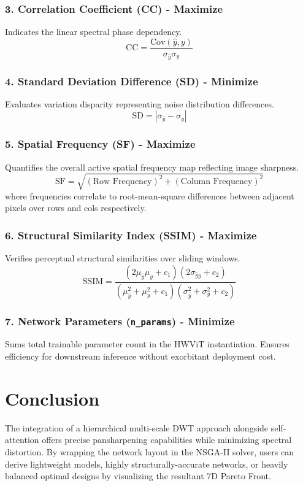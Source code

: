 \documentclass[11pt]{article}
\begin{document}
\subsubsection{3. Correlation Coefficient (CC) - Maximize}
Indicates the linear spectral phase dependency.
\[ \text{CC} = \frac{\text{Cov}(\hat{y}, y)}{\sigma_{\hat{y}} \sigma_y} \]

\subsubsection{4. Standard Deviation Difference (SD) - Minimize}
Evaluates variation disparity representing noise distribution differences.
\[ \text{SD} = \left| \sigma_{\hat{y}} - \sigma_y \right| \]

\subsubsection{5. Spatial Frequency (SF) - Maximize}
Quantifies the overall active spatial frequency map reflecting image sharpness.
\[ \text{SF} = \sqrt{ (\text{Row Frequency})^2 + (\text{Column Frequency})^2 } \]
where frequencies correlate to root-mean-square differences between adjacent pixels over rows and cols respectively.

\subsubsection{6. Structural Similarity Index (SSIM) - Maximize}
Verifies perceptual structural similarities over sliding windows.
\[ \text{SSIM} = \frac{(2 \mu_{\hat{y}} \mu_y + c_1)(2 \sigma_{\hat{y}y} + c_2)}{(\mu_{\hat{y}}^2 + \mu_y^2 + c_1)(\sigma_{\hat{y}}^2 + \sigma_y^2 + c_2)} \]

\subsubsection{7. Network Parameters (\texttt{n\_params}) - Minimize}
Sums total trainable parameter count in the HWViT instantiation. Ensures efficiency for downstream inference without exorbitant deployment cost.

\section{Conclusion}
The integration of a hierarchical multi-scale DWT approach alongside self-attention offers precise pansharpening capabilities while minimizing spectral distortion. By wrapping the network layout in the NSGA-II solver, users can derive lightweight models, highly structurally-accurate networks, or heavily balanced optimal designs by visualizing the resultant 7D Pareto Front.
\end{document}
